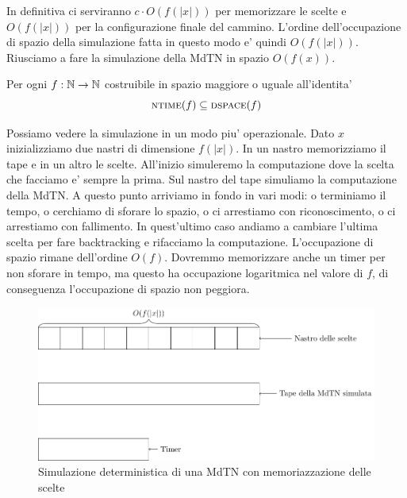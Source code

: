 In definitiva ci serviranno $c\cdot O(f(|x|))$ per memorizzare le scelte e $O(f(|x|))$ per la
configurazione finale del cammino. L'ordine dell'occupazione di spazio della simulazione fatta in
questo modo e' quindi $O(f(|x|))$. Riusciamo a fare la simulazione della MdTN in spazio $O(f(x))$.

\begin{thm}
    Per ogni $f:\mathbb{N} \to \mathbb{N}$ costruibile in spazio maggiore o uguale all'identita'
    \begin{equation*}
        \textsc{ntime}(f) \subseteq \textsc{dspace}(f)
    \end{equation*}
\end{thm}

Possiamo vedere la simulazione in un modo piu' operazionale. Dato $x$ inizializziamo due nastri di
dimensione $f(|x|)$. In un nastro memorizziamo il tape e in un altro le scelte. All'inizio
simuleremo la computazione dove la scelta che facciamo e' sempre la prima. Sul nastro del tape
simuliamo la computazione della MdTN. A questo punto arriviamo in fondo in vari modi: o terminiamo
il tempo, o cerchiamo di sforare lo spazio, o ci arrestiamo con riconoscimento, o ci arrestiamo con
fallimento. In quest'ultimo caso andiamo a cambiare l'ultima scelta per fare backtracking e
rifacciamo la computazione. L'occupazione di spazio rimane dell'ordine $O(f)$. Dovremmo memorizzare
anche un timer per non sforare in tempo, ma questo ha occupazione logaritmica nel valore di $f$, di
conseguenza l'occupazione di spazio non peggiora.

\begin{figure}[h]
    \begin{center}
        \includegraphics[scale=0.7]{./img/nondeterminism/Simulation.pdf}
        \caption{Simulazione deterministica di una MdTN con memoriazzazione delle scelte}
    \end{center}
\end{figure}
